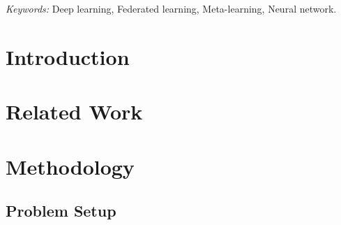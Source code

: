 \documentclass[12pt]{article}
\begin{document}
\bigskip
    \begin{abstract}%
        Federated learning (FL) is a powerful technique for collaboratively training a single centralized model on distributed local data sources.  By aggregating model information without disclosing the local training data, FL preserves data privacy. However, the inherent heterogeneity in local data sets challenges the performance of FL techniques, especially when data is very diverse across local sources. Personalized Federated Learning (PFL) can mitigate this challenge using multiple models but often requires additional memory and computation. This work does not propose a new PFL method but instead explores how learning rate decay within each local training round can improve model performance across local data sets after fine-tuning. We provide theoretical insights and empirical evidence of efficacy across diverse domains, including vision, text, and graph data. Our extensive experiments demonstrate that learning rate scheduling alone outperforms other FL methods regarding generalization to new data for both new and existing users. Moreover, it performs comparably to PFL methods, particularly for new users, while maintaining similar computational and memory requirements as FL techniques. Supplementary materials, including all code and instructions for reproducing the experiments, are available online.
    \end{abstract}

\noindent%
{\it Keywords:} Deep learning, Federated learning, Meta-learning, Neural network.
\vfill

\newpage
{} %
    \section{Introduction}
    \label{sec: decay-intro}
    

    \section{Related Work}
    \label{sec: decay-related}
    

    \section{Methodology}
    \label{sec: decay-method}

        \subsection{Problem Setup}
        
\end{document}

